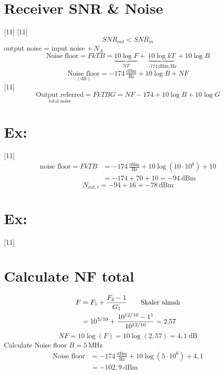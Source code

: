 \documentclass[11pt,a4paper]{article}
\begin{document}
\section{Receiver SNR \& Noise}
[11]
[11]
\[ SNR_{out} < SNR_{in} \]
output noise = input noise $+\, N_A$
\[ \text{Noise floor} = FkTB = \underbrace{10\log F}_{NF} + \underbrace{10\log kT}_{-174\,\mathrm{dBm/Hz}} + 10\log B \]
\[ \underset{(\mathrm{dB})}{\text{Noise floor}} = -174\,\tfrac{\mathrm{dBm}}{\mathrm{Hz}} + 10\log B + NF \]
[11]
\[ \underset{\text{total noise}}{\text{Output referred}} = FkTBG = NF - 174 + 10\log B + 10\log G \]

\section{Ex:}
[11]
\begin{align*}
\text{noise floor} = FkTB &= -174\,\tfrac{\mathrm{dBm}}{\mathrm{Hz}} + 10\log(10\cdot10^6) + 10\\
&= -174 + 70 + 10 = -94\ \mathrm{dBm}
\end{align*}
\[ N_{out,t} = -94 + 16 = -78\ \mathrm{dBm} \]

\section{Ex:}
[11]
\section{Calculate NF total}
\begin{align*}
F &= F_1 + \frac{F_2-1}{G_1} \qquad \text{Skaler almalı}\\
&= 10^{3/10} + \frac{10^{12/10}-1\footnotemark}{10^{12/10}} = 2{,}57
\end{align*}
\[ NF = 10\log(F) = 10\log(2{,}57) = 4{,}1\ \mathrm{dB} \]
Calculate Noise floor \quad $B = 5\,\mathrm{MHz}$
\begin{align*}
\text{Noise floor} &= -174\,\tfrac{\mathrm{dBm}}{\mathrm{Hz}} + 10\log(5\cdot10^6) + 4{,}1\\
&= -102{,}9\ \mathrm{dBm}
\end{align*}
\end{document}
